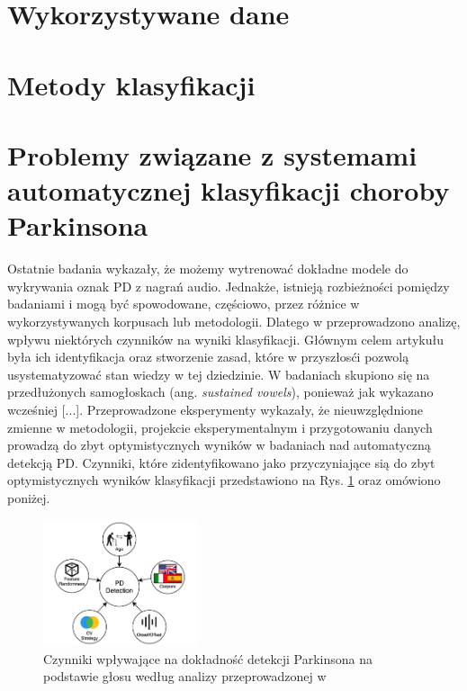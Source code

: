 \section{Wykorzystywane dane}\label{sec:dane-przeglad}


\section{Metody klasyfikacji}\label{sec:metody-klasyfikacji}


\section{Problemy związane z systemami automatycznej klasyfikacji choroby Parkinsona}\label{sec:problemy}

Ostatnie badania wykazały, że możemy wytrenować dokładne modele do wykrywania oznak PD z nagrań audio.
Jednakże, istnieją rozbieżności pomiędzy badaniami i mogą być spowodowane, częściowo, przez różnice w
wykorzystywanych korpusach lub metodologii.
Dlatego w  \cite{SustainedVowelsProblems} przeprowadzono analizę, wpływu niektórych czynników na wyniki klasyfikacji.
Głównym celem artykułu była ich identyfikacja oraz stworzenie zasad, które w przyszłosći pozwolą usystematyzować
stan wiedzy w tej dziedzinie.
W badaniach skupiono się na przedłużonych samogłoskach (ang. \emph{sustained vowels}), ponieważ jak wykazano wcześniej
[...].
Przeprowadzone eksperymenty wykazały, że nieuwzględnione zmienne w metodologii, projekcie eksperymentalnym i
przygotowaniu danych prowadzą do zbyt optymistycznych wyników w badaniach nad automatyczną detekcją PD.
Czynniki, które zidentyfikowano jako przyczyniające sią do zbyt optymistycznych wyników klasyfikacji
przedstawiono na Rys. \ref{fig:factors_PD_detection} oraz omówiono poniżej.


\begin{figure}[htbp]
	\centering
	\includegraphics[width=0.4\textwidth]{./img/influence_of_factors_on_PD_detection}
	\caption{Czynniki wpływające na dokładność detekcji Parkinsona na podstawie głosu według analizy przeprowadzonej w \cite{SustainedVowelsProblems}}
    \label{fig:factors_PD_detection}
\end{figure}


